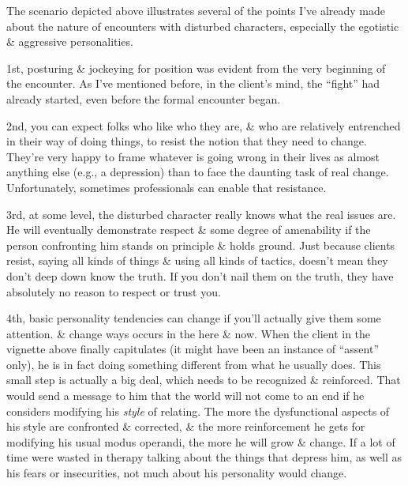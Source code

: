 \documentclass{article}
\numberwithin{equation}{section}
\begin{document}
The scenario depicted above illustrates several of the points I've already made about the nature of encounters with disturbed characters, especially the egotistic \& aggressive personalities.

1st, posturing \& jockeying for position was evident from the very beginning of the encounter. As I've mentioned before, in the client's mind, the ``fight'' had already started, even before the formal encounter began.

2nd, you can expect folks who like who they are, \& who are relatively entrenched in their way of doing things, to resist the notion that they need to change. They're very happy to frame whatever is going wrong in their lives as almost anything else (e.g., a depression) than to face the daunting task of real change. Unfortunately, sometimes professionals can enable that resistance.

3rd, at some level, the disturbed character really knows what the real issues are. He will eventually demonstrate respect \& some degree of amenability if the person confronting him stands on principle \& holds ground. Just because clients resist, saying all kinds of things \& using all kinds of tactics, doesn't mean they don't deep down know the truth. If you don't nail them on the truth, they have absolutely no reason to respect or trust you.

4th, basic personality tendencies can change if you'll actually give them some attention. \& change ways occurs in the here \& now. When the client in the vignette above finally capitulates (it might have been an instance of ``assent'' only), he is in fact doing something different from what he usually does. This small step is actually a big deal, which needs to be recognized \& reinforced. That would send a message to him that the world will not come to an end if he considers modifying his \textit{style} of relating. The more the dysfunctional aspects of his style are confronted \& corrected, \& the more reinforcement he gets for modifying his usual modus operandi, the more he will grow \& change. If a lot of time were wasted in therapy talking about the things that depress him, as well as his fears or insecurities, not much about his personality would change.
\end{document}
